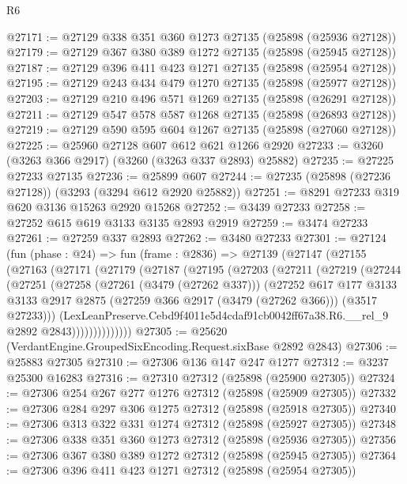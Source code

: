 \begin{lexlean}{R6}
\begin{coremodule}
@27171 := @27129 @338 @351 @360 @1273 @27135 (@25898 (@25936 @27128))
@27179 := @27129 @367 @380 @389 @1272 @27135 (@25898 (@25945 @27128))
@27187 := @27129 @396 @411 @423 @1271 @27135 (@25898 (@25954 @27128))
@27195 := @27129 @243 @434 @479 @1270 @27135 (@25898 (@25977 @27128))
@27203 := @27129 @210 @496 @571 @1269 @27135 (@25898 (@26291 @27128))
@27211 := @27129 @547 @578 @587 @1268 @27135 (@25898 (@26893 @27128))
@27219 := @27129 @590 @595 @604 @1267 @27135 (@25898 (@27060 @27128))
@27225 := @25960 @27128 @607 @612 @621 @1266 @2920
@27233 := @3260 (@3263 @366 @2917) (@3260 (@3263 @337 @2893) @25882)
@27235 := @27225 @27233 @27135
@27236 := @25899 @607
@27244 := @27235 (@25898 (@27236 @27128)) (@3293 (@3294 @612 @2920 @25882))
@27251 := @8291 @27233 @319 @620 @3136 @15263 @2920 @15268
@27252 := @3439 @27233
@27258 := @27252 @615 @619 @3133 @3135 @2893 @2919
@27259 := @3474 @27233
@27261 := @27259 @337 @2893
@27262 := @3480 @27233
@27301 := @27124
    (fun (phase : @24) =>
    fun (frame : @2836) =>
    @27139
      (@27147
        (@27155
          (@27163
            (@27171
              (@27179
                (@27187
                  (@27195
                    (@27203
                      (@27211
                        (@27219
                          (@27244
                            (@27251
                              (@27258
                                (@27261 (@3479 (@27262 @337)))
                                (@27252
                                  @617
                                  @177
                                  @3133
                                  @3133
                                  @2917
                                  @2875
                                  (@27259 @366 @2917 (@3479 (@27262 @366)))
                                  (@3517 @27233)))
                              (LexLeanPreserve.Cebd9f4011e5d4cdaf91cb0042ff67a38.R6.__rel_9
                                @2892
                                @2843))))))))))))))
@27305 := @25620 (VerdantEngine.GroupedSixEncoding.Request.sixBase @2892 @2843)
@27306 := @25883 @27305
@27310 := @27306 @136 @147 @247 @1277
@27312 := @3237 @25300 @16283
@27316 := @27310 @27312 (@25898 (@25900 @27305))
@27324 := @27306 @254 @267 @277 @1276 @27312 (@25898 (@25909 @27305))
@27332 := @27306 @284 @297 @306 @1275 @27312 (@25898 (@25918 @27305))
@27340 := @27306 @313 @322 @331 @1274 @27312 (@25898 (@25927 @27305))
@27348 := @27306 @338 @351 @360 @1273 @27312 (@25898 (@25936 @27305))
@27356 := @27306 @367 @380 @389 @1272 @27312 (@25898 (@25945 @27305))
@27364 := @27306 @396 @411 @423 @1271 @27312 (@25898 (@25954 @27305))

\end{coremodule}
\end{lexlean}
